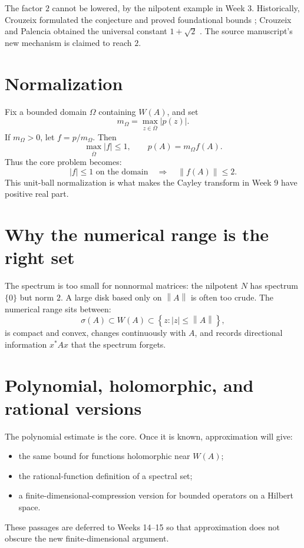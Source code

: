 \documentclass[11pt,oneside,openany]{book}
\theoremstyle{definition}
\theoremstyle{remark}
\newcommand{\spec}{\sigma}
\newcommand{\norm}[1]{\left\lVert #1\right\rVert}
\newcommand{\set}[1]{\left\{#1\right\}}
\begin{document}
The factor \(2\) cannot be lowered, by the nilpotent example in Week 3.
Historically, Crouzeix formulated the conjecture and proved foundational
bounds \cite{Crouzeix2004,Crouzeix2007}; Crouzeix and Palencia obtained
the universal constant \(1+\sqrt2\)
\cite{CrouzeixPalencia2017}.  The source manuscript's new mechanism
is claimed to reach \(2\).

\section{Normalization}

Fix a bounded domain \(\Omega\) containing \(W(A)\), and set
\[
  m_\Omega=\max_{z\in\overline\Omega}|p(z)|.
\]
If \(m_\Omega>0\), let \(f=p/m_\Omega\).  Then
\[
  \max_{\overline\Omega}|f|\leq1,
  \qquad
  p(A)=m_\Omega f(A).
\]
Thus the core problem becomes:
\[
  \boxed{\quad |f|\leq1\text{ on the domain}
  \quad\Longrightarrow\quad \norm{f(A)}\leq2.\quad}
\]
This unit-ball normalization is what makes the Cayley transform in
Week 9 have positive real part.

\section{Why the numerical range is the right set}

The spectrum is too small for nonnormal matrices: the nilpotent \(N\)
has spectrum \(\{0\}\) but norm \(2\).  A large disk based only on
\(\norm{A}\) is often too crude.  The numerical range sits between:
\[
  \spec(A)\subset W(A)\subset\set{z:|z|\leq\norm{A}},
\]
is compact and convex, changes continuously with \(A\), and records
directional information \(x^*Ax\) that the spectrum forgets.

\section{Polynomial, holomorphic, and rational versions}

The polynomial estimate is the core.  Once it is known, approximation
will give:
\begin{itemize}
  \item the same bound for functions holomorphic near \(W(A)\);
  \item the rational-function definition of a spectral set;
  \item a finite-dimensional-compression version for bounded operators
  on a Hilbert space.
\end{itemize}
These passages are deferred to Weeks 14--15 so that approximation does
not obscure the new finite-dimensional argument.
\end{document}
